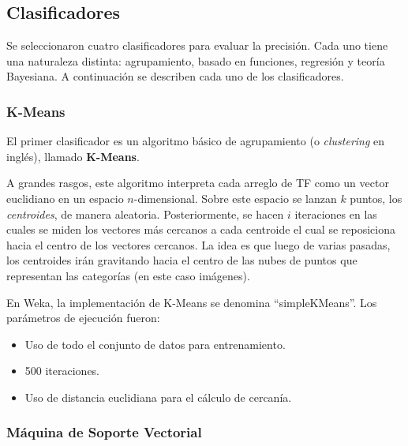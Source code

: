 \subsection{Clasificadores}

Se seleccionaron cuatro clasificadores para evaluar la precisión. Cada uno tiene una naturaleza distinta: agrupamiento, basado en funciones, regresión y teoría Bayesiana. A continuación se describen cada uno de los clasificadores.


\subsubsection{K-Means}

El primer clasificador es un algoritmo básico de agrupamiento (o \textit{clustering} en inglés), llamado \textbf{K-Means}\cite{MacQueen1967}.

A grandes rasgos, este algoritmo interpreta cada arreglo de TF como un vector euclidiano en un espacio $n$-dimensional. Sobre este espacio se lanzan $k$ puntos, los \textit{centroides}, de manera aleatoria. 
Posteriormente, se hacen $i$ iteraciones en las cuales se miden los vectores más cercanos a cada centroide el cual se reposiciona hacia el centro de los vectores cercanos.
La idea es que luego de varias pasadas, los centroides irán gravitando hacia el centro de las nubes de puntos que representan las categorías (en este caso imágenes).

En Weka, la implementación de K-Means se denomina ``simpleKMeans''. Los parámetros de ejecución fueron:
\begin{itemize}
    \item Uso de todo el conjunto de datos para entrenamiento.
    \item 500 iteraciones.
    \item Uso de distancia euclidiana para el cálculo de cercanía.
\end{itemize}


\subsubsection{Máquina de Soporte Vectorial}

